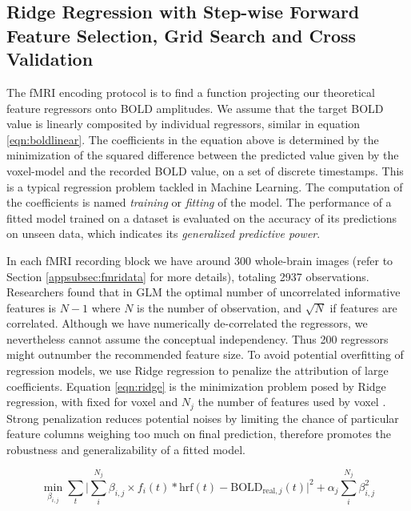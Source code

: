 \subsection{Ridge Regression with Step-wise Forward Feature Selection, Grid Search and Cross Validation}
\label{sec:ridgemethod}
The fMRI encoding protocol is to find a function projecting our theoretical feature regressors onto BOLD amplitudes. We assume that the target BOLD value is linearly composited by individual regressors, similar in equation \ref{eqn:boldlinear}. The coefficients in the equation above is determined by the minimization of the squared difference between the predicted value given by the voxel-model and the recorded BOLD value, on a set of discrete timestamps. This is a typical regression problem tackled in Machine Learning. The computation of the coefficients is named \emph{training} or \emph{fitting} of the model. The performance of a fitted model trained on a dataset is evaluated on the accuracy of its predictions on unseen data, which indicates its \emph{generalized predictive power}.

In each fMRI recording block we have around 300 whole-brain images (refer to Section \ref{appsubsec:fmridata} for more details), totaling 2937 observations. Researchers \parencite{huaOptimalNumberFeatures2005} found that in GLM the optimal number of uncorrelated informative features is \(N - 1\) where \(N\) is the number of observation, and \(\sqrt{N}\) if features are correlated. Although we have numerically de-correlated the regressors, we nevertheless cannot assume the conceptual independency. Thus 200 regressors might outnumber the recommended feature size. To avoid potential overfitting of regression models, we use Ridge regression to penalize the attribution of large coefficients. Equation \ref{eqn:ridge} is the minimization problem posed by Ridge regression, with  fixed for voxel  and \(N_j\) the number of features used by voxel . Strong penalization reduces potential noises by limiting the chance of particular feature columns weighing too much on final prediction, therefore promotes the robustness and generalizability of a fitted model.

\begin{equation}
    \min_{\beta_{i,j}}{\sum_{t}{\vert\sum_{i}^{N_j}{\beta_{i,j} \times f_{i}(t) * \text{hrf}(t)} - \text{BOLD}_{\text{real}, j}(t)\vert ^2} + \alpha_j \sum_{i}^{N_j}{\beta_{i,j}^2}}
\label{eqn:ridge}
    \end{equation}

